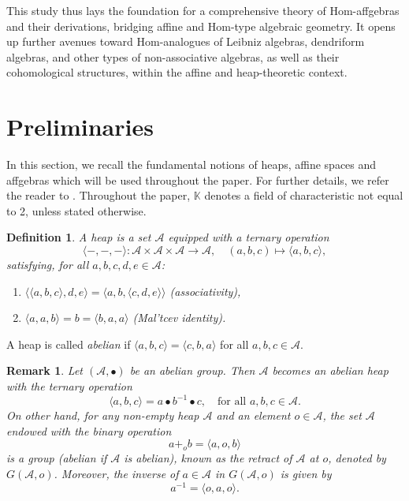 \documentclass[14pt]{article}
\theoremstyle{Definition}
\newtheorem{Def}[thm]{Definition}
\newtheorem{Rem}[thm]{Remark}
\theoremstyle{remark}
\begin{document}
This study thus lays the foundation for a comprehensive theory of Hom-affgebras and their derivations, bridging affine and Hom-type algebraic geometry. It opens up further avenues toward Hom-analogues of Leibniz algebras, dendriform algebras, and other types of non-associative algebras, as well as their cohomological structures, within the affine and heap-theoretic context.


\section{Preliminaries}

In this section, we recall the fundamental notions of heaps, affine spaces and affgebras which will be used throughout the paper. For further details, we refer the reader to \cite{Bre1, Brz1, Brz1, Brz2, Brz3, Brz22, Brz222, And1, And2, Jac1}. Throughout the paper, $\mathbb{K}$ denotes a field of characteristic not equal to 2, unless stated otherwise.

\begin{Def}\cite{Pru1,Brz22,Brz222}
A \emph{heap} is a set $\mathcal{A}$ equipped with a ternary operation 
\[
\langle -,-,- \rangle : \mathcal{A} \times \mathcal{A} \times \mathcal{A} \longrightarrow \mathcal{A}, \quad (a,b,c) \mapsto \langle a,b,c \rangle,
\]
satisfying, for all $a,b,c,d,e \in \mathcal{A}$:
\begin{enumerate}
\item $\langle \langle a,b,c \rangle, d, e \rangle = \langle a,b, \langle c,d,e \rangle \rangle$ \quad (associativity),
\item $\langle a,a,b \rangle = b = \langle b,a,a \rangle$ \quad (Mal'tcev identity).
\end{enumerate}
\end{Def}
A heap is called \emph{abelian} if $\langle a,b,c\rangle = \langle c,b,a\rangle$ for all $a,b,c \in \mathcal{A}$.
\begin{Rem}\label{re1}
Let $(\mathcal{A},\bullet)$ be an abelian group. Then $\mathcal{A}$ becomes an abelian heap with the ternary operation 
\[
\langle a,b,c\rangle = a\bullet b^{-1}\bullet c, \quad \text{for all } a,b,c \in \mathcal{A}.
\]
On other hand, for any non-empty heap $\mathcal{A}$ and an element $o \in \mathcal{A}$, the set $\mathcal{A}$ endowed with the binary operation  
\[
a +_{o} b = \langle a, o, b \rangle
\]  
is a group (abelian if $\mathcal{A}$ is abelian), known as the \emph{retract} of $\mathcal{A}$ at $o$, denoted by $G(\mathcal{A},o)$.  
Moreover, the inverse of $a \in \mathcal{A}$ in $G(\mathcal{A},o)$ is given by  
\[
a^{-1} = \langle o, a, o \rangle.
\]
\end{Rem}
\end{document}

